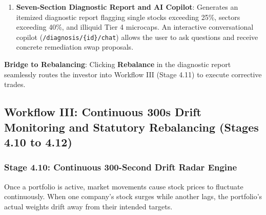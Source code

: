 \begin{enumerate}
\begin{itemize}
        \item $\text{HHI} < 1,500$: \textbf{Safe / Well Diversified}. Wealth is distributed healthily across multiple companies.
        \item $1,500 \le \text{HHI} \le 2,500$: \textbf{Moderate Concentration}. The portfolio is somewhat top-heavy and requires monitoring.
        \item $\text{HHI} > 2,500$: \textbf{High Risk / Dangerously Concentrated}. A large percentage of capital is tied up in one or two stocks, exposing the investor to severe loss if those companies suffer setbacks.
    \end{itemize}
    \item \textbf{Seven-Section Diagnostic Report and AI Copilot}:
    Generates an itemized diagnostic report flagging single stocks exceeding 25\%, sectors exceeding 40\%, and illiquid Tier 4 microcaps. An interactive conversational copilot (\texttt{/diagnosis/\{id\}/chat}) allows the user to ask questions and receive concrete remediation swap proposals.
\end{enumerate}

\noindent \textbf{Bridge to Rebalancing}: Clicking \textbf{Rebalance} in the diagnostic report seamlessly routes the investor into Workflow III (Stage 4.11) to execute corrective trades.

\subsection{Workflow III: Continuous 300s Drift Monitoring and Statutory Rebalancing (Stages 4.10 to 4.12)}

\subsubsection{Stage 4.10: Continuous 300-Second Drift Radar Engine}
Once a portfolio is active, market movements cause stock prices to fluctuate continuously. When one company's stock surges while another lags, the portfolio's actual weights drift away from their intended targets.

